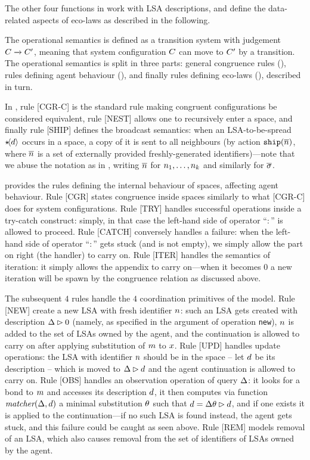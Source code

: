 \documentclass[12pt,a4paper,twoside,openright]{book}
\begin{document}
The other four functions in  work with LSA descriptions, and define the data-related aspects of eco-laws as described in the following.

The operational semantics is defined as a transition system with judgement $C\xrightarrow{}C'$, meaning that system configuration $C$ can move to $C'$ by a transition.
%
The operational semantics is split in three parts: general congruence rules (), rules defining agent behaviour (), and finally rules defining eco-laws (), described in turn.

In , rule [CGR-C] is the standard rule making congruent configurations be considered equivalent, rule [NEST] allows one to recursively enter a space, and finally rule [SHIP] defines the broadcast semantics: when an LSA-to-be-spread $\star\!\langle d\rangle$ occurs in a space, a copy of it is sent to all neighbours (by action $\texttt{ship}(\overline{n})$, where $\overline{n}$ is a set of externally provided freshly-generated identifiers)---note that we abuse the notation as in \cite{FJ}, writing $\overline{n}$ for $n_1,\ldots,n_k$ and similarly for $\overline{\sigma}$.

 provides the rules defining the internal behaviour of spaces, affecting agent behaviour.
%
Rule [CGR] states congruence inside spaces similarly to what [CGR-C] does for system configurations.
%
Rule [TRY] handles successful operations inside a try-catch construct: simply, in that case the left-hand side of operator ``$:$'' is allowed to proceed.
%
Rule [CATCH] conversely handles a failure: when the left-hand side of operator ``$:$'' gets stuck (and is not empty), we simply allow the part on right (the handler) to carry on.
%
Rule [ITER] handles the semantics of iteration: it simply allows the appendix to carry on---when it becomes $0$ a new iteration will be spawn by the congruence relation as discussed above.

The subsequent $4$ rules handle the $4$ coordination primitives of the model.
%
Rule [NEW] create a new LSA with fresh identifier $n$: such an LSA gets created with description $\Delta\rhd 0$ (namely, as specified in the argument of operation \texttt{new}), $n$ is added to the set of LSAs owned by the agent, and the continuation is allowed to carry on after applying substitution of $m$ to $x$.
%
Rule [UPD] handles update operations: the LSA with identifier $n$ should be in the space -- let $d$ be its description -- which is moved to $\Delta\rhd d$ and the agent continuation is allowed to carry on.
%
Rule [OBS] handles an observation operation of query $\Delta$: it looks for a bond to $m$ and accesses its description $d$, it then computes via function $\textit{matcher}(\Delta,d)$ a minimal substitution $\theta$ such that $d=\Delta\theta\rhd d$, and if one exists it is applied to the continuation---if no such LSA is found instead, the agent gets stuck, and this failure could be caught as seen above.
%
Rule [REM] models removal of an LSA, which also causes removal from the set of identifiers of LSAs owned by the agent.
\end{document}
